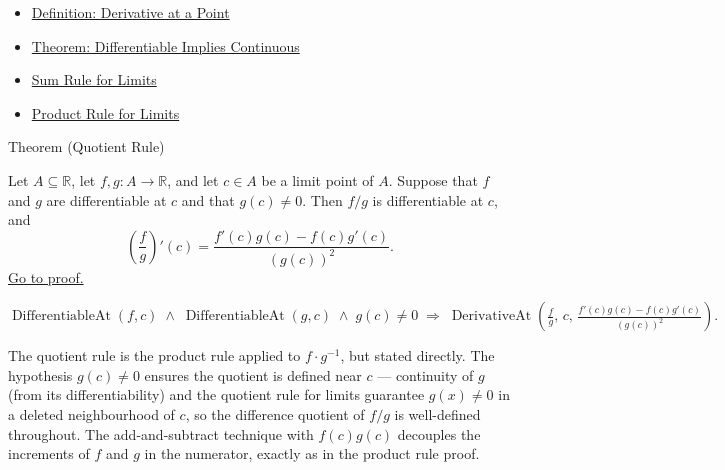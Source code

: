 \begin{dependencies}
\begin{itemize}
  \item \hyperref[def:derivative-at-a-point]{Definition: Derivative at a Point}
  \item \hyperref[thm:differentiable-implies-continuous]{Theorem: Differentiable Implies Continuous}
  \item \hyperref[thm:limit-sum]{Sum Rule for Limits}
  \item \hyperref[thm:limit-product]{Product Rule for Limits}
\end{itemize}
\end{dependencies}


\begin{theorembox}{Theorem (Quotient Rule)}
\begin{theorem}
\label{thm:quotient-rule}
Let $A \subseteq \mathbb{R}$, let $f, g : A \to \mathbb{R}$, and let $c \in A$ be a limit point of $A$. Suppose that $f$ and $g$ are differentiable at $c$ and that $g(c) \neq 0$. Then $f/g$ is differentiable at $c$, and
\[
\left(\frac{f}{g}\right)'(c) = \frac{f'(c)g(c) - f(c)g'(c)}{(g(c))^2}.
\]
\hyperref[prf:quotient-rule]{Go to proof.}
\end{theorem}
\end{theorembox}

\begin{remark*}
\[
\operatorname{DifferentiableAt}(f,c) \;\land\; \operatorname{DifferentiableAt}(g,c) \;\land\; g(c)\neq 0
\;\Rightarrow\;
\operatorname{DerivativeAt}\!\left(\tfrac{f}{g},\,c,\,\tfrac{f'(c)g(c)-f(c)g'(c)}{(g(c))^2}\right).
\]
\end{remark*}

\begin{remark*}[Interpretation]
The quotient rule is the product rule applied to $f \cdot g^{-1}$, but stated directly. The hypothesis $g(c) \neq 0$ ensures the quotient is defined near $c$ --- continuity of $g$ (from its differentiability) and the quotient rule for limits guarantee $g(x) \neq 0$ in a deleted neighbourhood of $c$, so the difference quotient of $f/g$ is well-defined throughout. The add-and-subtract technique with $f(c)g(c)$ decouples the increments of $f$ and $g$ in the numerator, exactly as in the product rule proof.
\end{remark*}

